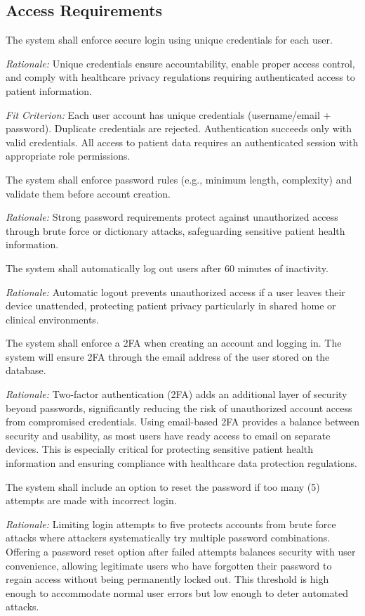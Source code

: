 \documentclass[12pt]{article}
\newcommand{\rationale}[1]{\par\emph{Rationale:} #1}
\newcommand{\fitcrit}[1]{\par\emph{Fit Criterion:} #1}
\begin{document}
\subsection{Access Requirements}
\begin{reqlist}
	\item[SR-AR 1.] The system shall enforce secure login using unique credentials for each user.
	\rationale{Unique credentials ensure accountability, enable proper access control, and comply with healthcare privacy regulations requiring authenticated access to patient information.}
	\fitcrit{Each user account has unique credentials (username/email + password). Duplicate credentials are rejected. Authentication succeeds only with valid credentials. All access to patient data requires an authenticated session with appropriate role permissions.}
	
	\item[SR-AR 2.] The system shall enforce password rules (e.g., minimum length, complexity) and validate them before account creation.
	\rationale{Strong password requirements protect against unauthorized access through brute force or dictionary attacks, safeguarding sensitive patient health information.}
	
	\item[SR-AR 3.] The system shall automatically log out users after 60 minutes of inactivity.
	\rationale{Automatic logout prevents unauthorized access if a user leaves their device unattended, protecting patient privacy particularly in shared home or clinical environments.}
	
	\item[SR-AR 4.] The system shall enforce a 2FA when creating an account and logging in. The system will ensure 2FA through the email address of the user stored on the database.
	\rationale{Two-factor authentication (2FA) adds an additional layer of security beyond passwords, significantly reducing the risk of unauthorized account access from compromised credentials. Using email-based 2FA provides a balance between security and usability, as most users have ready access to email on separate devices. This is especially critical for protecting sensitive patient health information and ensuring compliance with healthcare data protection regulations.}
	
	\item[SR3.] The system shall include an option to reset the password if too many (5) attempts are made with incorrect login.
	\rationale{Limiting login attempts to five protects accounts from brute force attacks where attackers systematically try multiple password combinations. Offering a password reset option after failed attempts balances security with user convenience, allowing legitimate users who have forgotten their password to regain access without being permanently locked out. This threshold is high enough to accommodate normal user errors but low enough to deter automated attacks.}
\end{reqlist}
\end{document}
